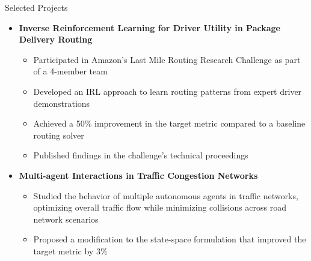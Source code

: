 \begin{rSection}{Selected Projects}
\begin{itemize}
\item \textbf{Inverse Reinforcement Learning for Driver Utility in Package Delivery Routing}
\begin{itemize}
    \item Participated in Amazon's Last Mile Routing Research Challenge as part of a 4-member team
    \item Developed an IRL approach to learn routing patterns from expert driver demonstrations
    \item Achieved a 50\% improvement in the target metric compared to a baseline routing solver
    \item Published findings in the challenge's technical proceedings
\end{itemize}

\item \textbf{Multi-agent Interactions in Traffic Congestion Networks}
\begin{itemize}
    \item Studied the behavior of multiple autonomous agents in traffic networks, optimizing overall traffic flow while minimizing collisions across road network scenarios
    \item Proposed a modification to the state-space formulation that improved the target metric by 3\%
\end{itemize}
\end{itemize}
\end{rSection}
